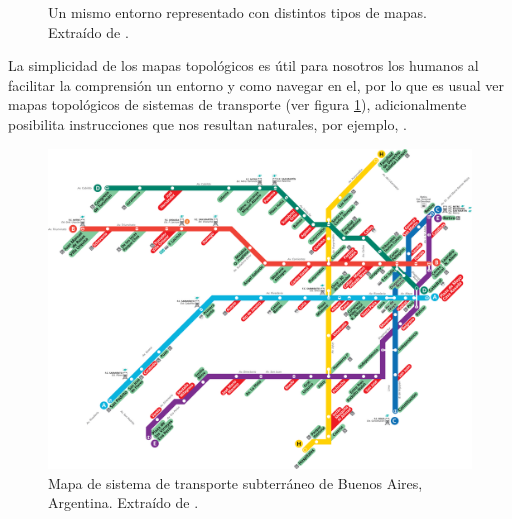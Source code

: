 \begin{figure}[H]
  \centering
  \qquad
  \qquad
  \caption{Un mismo entorno representado con distintos tipos de mapas. Extraído de \cite{choset2005principles}.}
\end{figure}


La simplicidad de los mapas topológicos es útil para nosotros los humanos al facilitar la comprensión un entorno y como navegar en el, por lo que es usual ver mapas topológicos de sistemas de transporte (ver figura \ref{fig:metroBsAs}), adicionalmente posibilita instrucciones que nos resultan naturales, por ejemplo, .

\begin{figure}[H]
  \center
  \includegraphics[width=1\linewidth]{imagenes/metroBsAs.png}
  \caption{Mapa de sistema de transporte subterráneo de Buenos Aires, Argentina. Extraído de \cite{metroBsAs}.}\label{fig:metroBsAs}
\end{figure} 

